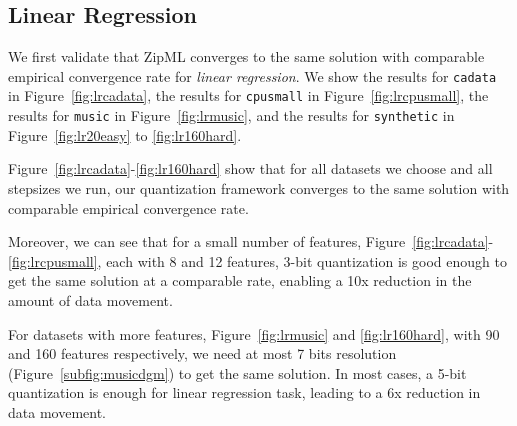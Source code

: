 \documentclass{article}
\begin{document}
\subsection{Linear Regression}
We first validate that ZipML 
converges to the same solution with comparable
empirical convergence rate for \emph{linear regression}.
We show the results for \texttt{cadata} in Figure~\ref{fig:lrcadata}, the results for \texttt{cpusmall} in Figure~\ref{fig:lrcpusmall}, the results for \texttt{music} in Figure~\ref{fig:lrmusic}, and the results for \texttt{synthetic} in Figure~\ref{fig:lr20easy} to \ref{fig:lr160hard}.

Figure~\ref{fig:lrcadata}-\ref{fig:lr160hard} show that for all datasets we choose and all stepsizes we run, our quantization framework
converges to the same solution with comparable
empirical convergence rate. 

Moreover, we can see that for a small number of features, Figure~\ref{fig:lrcadata}-\ref{fig:lrcpusmall}, each with 8 and 12 features, 3-bit quantization is good enough to get the same solution at a comparable rate, enabling a 10x reduction in the amount of data movement.

For datasets with more features, Figure~\ref{fig:lrmusic} and \ref{fig:lr160hard}, with 90 and 160 features respectively, we need at most 7 bits resolution (Figure~\ref{subfig:musicdgm}) to get the same solution. In most cases, a 5-bit quantization is enough for linear regression task, leading to a 6x reduction in data movement.
\end{document}
